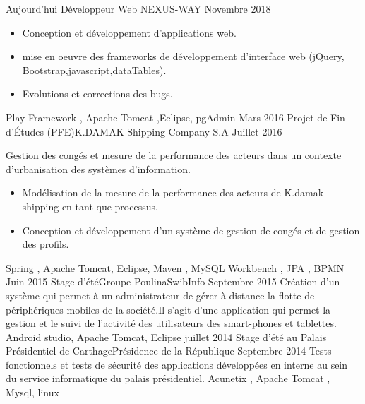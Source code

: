%
%
%
\begin{experiences}
	\experience
	{Aujourd'hui}   {Développeur Web }{NEXUS-WAY}{}
	{Novembre 2018} {
		\begin{itemize}
			\item Conception et développement d'applications web.
			\item mise en oeuvre des frameworks de développement d'interface web (jQuery, Bootstrap,javascript,dataTables).

			\item Evolutions et corrections des bugs.
		\end{itemize}
	}
	{Play Framework , Apache Tomcat ,Eclipse, pgAdmin}
	\emptySeparator
	\experience
	{Mars 2016} {Projet de Fin d’Études (PFE)}{K.DAMAK Shipping Company S.A}{}
	{Juillet 2016}    {
		Gestion des congés et mesure de la performance des acteurs dans un contexte d’urbanisation des systèmes d’information.
		\begin{itemize}
			\item Modélisation de la mesure de la performance des acteurs de K.damak shipping en tant que processus.
			\item Conception et développement d’un système de gestion de congés et de gestion des profils.
		\end{itemize}
	}
	{Spring , Apache Tomcat, Eclipse, Maven , MySQL Workbench , JPA , BPMN }
	\emptySeparator
	\experience
	{Juin 2015}     {Stage d’été}{Groupe Poulina}{SwibInfo}
	{Septembre 2015}    {
		Création d’un système qui permet à un administrateur de gérer à distance la flotte de périphériques mobiles de la société.Il s’agit d’une application qui permet la gestion et le suivi de l’activité des utilisateurs des smart-phones et tablettes.
	}
	{ Android studio, Apache Tomcat, Eclipse}
	\emptySeparator
	\experience
	{juillet 2014}   {Stage d’été }{au Palais Présidentiel de Carthage}{Présidence de la République}
	{Septembre 2014} {
		Tests fonctionnels et tests de sécurité des applications développées en interne au sein du service informatique du palais présidentiel.
	}
	{Acunetix , Apache Tomcat , Mysql, linux}
	\emptySeparator


\end{experiences}
